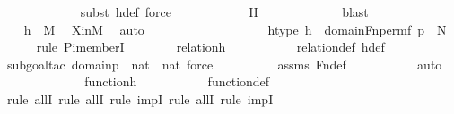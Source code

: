 \begin{isabellebody}
\ \ \ \ \ \ \ \ \ \ \ \isamarkupfalse%
{\isacharparenleft}{\kern0pt}subst\ h{\isacharunderscore}{\kern0pt}def{\isacharcomma}{\kern0pt}\ force{\isacharparenright}{\kern0pt}\isanewline
\ \ \ \ \ \ \ \ \ \ \isamarkupfalse%
\ H\ \isanewline
\ \ \ \ \ \ \ \ \ \ \isamarkupfalse%
\ blast\ \isanewline
\ \ \ \ \ \ \isamarkupfalse%
\isanewline
\ \ \ \ \ \ \isamarkupfalse%
\ \isamarkupfalse%
\ {\isachardoublequoteopen}h\ {\isasymin}\ M{\isachardoublequoteclose}\ \isamarkupfalse%
\ XinM\ \isamarkupfalse%
\ auto\isanewline
\ \ \ \ \isamarkupfalse%
\isanewline
\ \ \ \ \ \ \ \ \isanewline
\ \ \ \ \isamarkupfalse%
\ htype{\isacharcolon}{\kern0pt}\ {\isachardoublequoteopen}h\ {\isasymin}\ domain{\isacharparenleft}{\kern0pt}Fn{\isacharunderscore}{\kern0pt}perm{\isacharparenleft}{\kern0pt}f{\isacharcomma}{\kern0pt}\ p{\isacharparenright}{\kern0pt}{\isacharparenright}{\kern0pt}\ {\isasymrightarrow}\ N{\isachardoublequoteclose}\isanewline
\ \ \ \ \isamarkupfalse%
{\isacharparenleft}{\kern0pt}rule\ Pi{\isacharunderscore}{\kern0pt}memberI{\isacharparenright}{\kern0pt}\isanewline
\ \ \ \ \ \ \isamarkupfalse%
\ {\isachardoublequoteopen}relation{\isacharparenleft}{\kern0pt}h{\isacharparenright}{\kern0pt}{\isachardoublequoteclose}\ \isanewline
\ \ \ \ \ \ \ \ \isamarkupfalse%
\ relation{\isacharunderscore}{\kern0pt}def\ h{\isacharunderscore}{\kern0pt}def\isanewline
\ \ \ \ \ \ \ \ \isamarkupfalse%
{\isacharparenleft}{\kern0pt}subgoal{\isacharunderscore}{\kern0pt}tac\ {\isachardoublequoteopen}domain{\isacharparenleft}{\kern0pt}p{\isacharparenright}{\kern0pt}\ {\isasymsubseteq}\ nat\ {\isasymtimes}\ nat{\isachardoublequoteclose}{\isacharcomma}{\kern0pt}\ force{\isacharparenright}{\kern0pt}\isanewline
\ \ \ \ \ \ \ \ \isamarkupfalse%
\ assms\ Fn{\isacharunderscore}{\kern0pt}def\ \isanewline
\ \ \ \ \ \ \ \ \isamarkupfalse%
\ auto\isanewline
\ \ \ \ \isamarkupfalse%
\isanewline
\ \ \ \ \ \ \isamarkupfalse%
\ {\isachardoublequoteopen}function{\isacharparenleft}{\kern0pt}h{\isacharparenright}{\kern0pt}{\isachardoublequoteclose}\ \isanewline
\ \ \ \ \ \ \ \ \isamarkupfalse%
\ function{\isacharunderscore}{\kern0pt}def\ \isanewline
\ \ \ \ \ \ \isamarkupfalse%
{\isacharparenleft}{\kern0pt}rule\ allI{\isacharcomma}{\kern0pt}\ rule\ allI{\isacharcomma}{\kern0pt}\ rule\ impI{\isacharcomma}{\kern0pt}\ rule\ allI{\isacharcomma}{\kern0pt}\ rule\ impI{\isacharparenright}{\kern0pt}\isanewline

\end{isabellebody}
